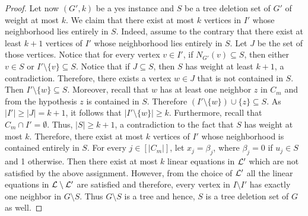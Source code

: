 \documentclass[a4paper,11pt]{article}
\begin{document}
\begin{proof}
Let now $(G',k)$ be a yes instance and $S$ be a tree deletion set of $G'$ of weight at most $k$. 
We claim that there exist at most $k$ vertices 
in $I'$ whose neighborhood lies entirely in $S$. Indeed, assume to the contrary that there exist at least $k+1$ vertices of $I'$ whose neighborhood lies
entirely in $S$. Let $J$ be the set of those vertices. Notice that for every vertex $v\in I'$, if $N_{G'}(v)\subseteq S$, then either $v\in S$ or 
$I' \setminus \{v\}\subseteq S$.
Notice that if $J\subseteq S$, then $S$ has weight at least $k+1$, a contradiction. Therefore, there exists a vertex $w\in J$ that is not contained in $S$.
Then $I'\setminus \{w\}\subseteq S$.  Moreover, recall that $w$ has at least one neighbor $z$ in $C_{m}$ and from the hypothesis $z$ is contained in $S$. 
Therefore $(I'\setminus \{w\})\cup \{z\}\subseteq S$. As $|I'|\geq |J|=k+1$, it follows that $|I'\setminus \{w\}| \geq k$. Furthermore, recall that 
$C_{m}\cap I'=\emptyset$. Thus, $|S|\geq k+1$, a contradiction to the fact that $S$ has weight at most $k$.
Therefore, there exist at most $k$ vertices of $I'$ whose neighborhood is contained entirely in $S$.
For every $j\in [|C_{m}|]$, let $x_{j}=\beta_{j}$, where $\beta_{j}=0$ if $u_{j}\in S$ and 1 otherwise.
Then there exist at most $k$ linear equations in ${\cal L}'$ which are not satisfied by the above assignment. 
However, from the choice of ${\cal L}'$ all the linear equations in ${\cal L}\setminus {\cal L}'$ are satisfied and therefore, every vertex in $I\setminus I'$ has exactly one 
neighbor in $G\setminus S$. Thus $G\setminus S$ is a tree and hence, $S$ is a tree deletion set of $G$ as well.


\end{proof}
\end{document}
